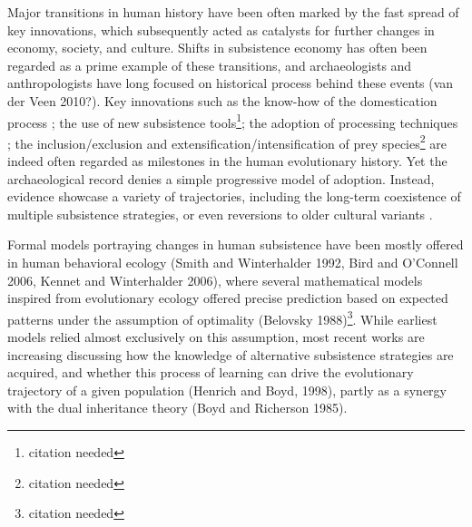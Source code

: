 \documentclass[preprint,authoryear]{elsarticle}
\begin{document}
Major transitions in human history have been often marked by the fast spread of key innovations, which subsequently acted as catalysts for further changes in economy, society, and culture. Shifts in subsistence economy has often been regarded as a prime example of these transitions, and archaeologists and anthropologists have long focused on historical process behind these events (van der Veen 2010?). Key innovations such as the know-how of the domestication process \citep{barker2006}; the use of new subsistence tools\footnote{citation needed}; the adoption of processing techniques \citep{molleson1993}; the inclusion/exclusion and extensification/intensification of prey species\footnote{citation needed} are indeed often regarded as milestones in the human evolutionary history. Yet the archaeological record denies a simple progressive model of adoption. Instead, evidence showcase a variety of trajectories, including the long-term coexistence of multiple subsistence strategies, or even reversions to older cultural variants \citep{rowley2001}.

Formal models portraying changes in human subsistence have been mostly offered in human behavioral ecology (Smith and Winterhalder 1992, Bird and O'Connell 2006, Kennet and Winterhalder 2006), where several mathematical models inspired from evolutionary ecology offered precise prediction based on expected patterns under the assumption of optimality (Belovsky 1988)\footnote{citation needed}. While earliest models relied almost exclusively on this assumption, most recent works are increasing discussing how the knowledge of alternative subsistence strategies are acquired, and whether this process of learning can drive the evolutionary trajectory of a given population (Henrich and Boyd, 1998), partly as a synergy with the dual inheritance theory (Boyd and Richerson 1985). 
\end{document}
